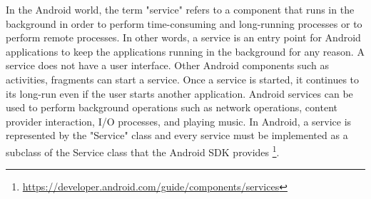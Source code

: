 In the Android world, the term "service" refers to a component that runs in the background in order to perform time-consuming and long-running processes or to perform remote processes. In other words, a service is an entry point for Android applications to keep the applications running in the background for any reason. A service does not have a user interface. Other Android components such as activities, fragments can start a service. Once a service is started, it continues to its long-run even if the user starts another application. Android services can be used to perform background operations such as network operations, content provider interaction, I/O processes, and playing music. In Android, a service is represented by the "Service" class and every service must be implemented as a subclass of the Service class that the Android SDK provides \footnote{\url{https://developer.android.com/guide/components/services}}.